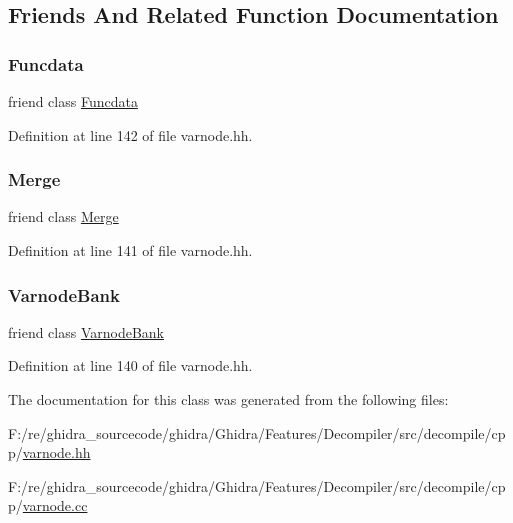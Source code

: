 \subsection{Friends And Related Function Documentation}
\mbox{\label{class_varnode_a16ade990887167c11c41cb88121bb449}} 
\subsubsection{\texorpdfstring{Funcdata}{Funcdata}}
{\footnotesize\ttfamily friend class \mbox{\hyperlink{class_funcdata}{Funcdata}}\hspace{0.3cm}{\ttfamily [friend]}}



Definition at line 142 of file varnode.\+hh.

\mbox{\label{class_varnode_ada039d79291c7baead36ca12c2f1737b}} 
\subsubsection{\texorpdfstring{Merge}{Merge}}
{\footnotesize\ttfamily friend class \mbox{\hyperlink{class_merge}{Merge}}\hspace{0.3cm}{\ttfamily [friend]}}



Definition at line 141 of file varnode.\+hh.

\mbox{\label{class_varnode_a794a269a99c505d3cd54abc16c456e0d}} 
\subsubsection{\texorpdfstring{VarnodeBank}{VarnodeBank}}
{\footnotesize\ttfamily friend class \mbox{\hyperlink{class_varnode_bank}{Varnode\+Bank}}\hspace{0.3cm}{\ttfamily [friend]}}



Definition at line 140 of file varnode.\+hh.



The documentation for this class was generated from the following files\+:\begin{DoxyCompactItemize}
\item 
F\+:/re/ghidra\+\_\+sourcecode/ghidra/\+Ghidra/\+Features/\+Decompiler/src/decompile/cpp/\mbox{\hyperlink{varnode_8hh}{varnode.\+hh}}\item 
F\+:/re/ghidra\+\_\+sourcecode/ghidra/\+Ghidra/\+Features/\+Decompiler/src/decompile/cpp/\mbox{\hyperlink{varnode_8cc}{varnode.\+cc}}\end{DoxyCompactItemize}
